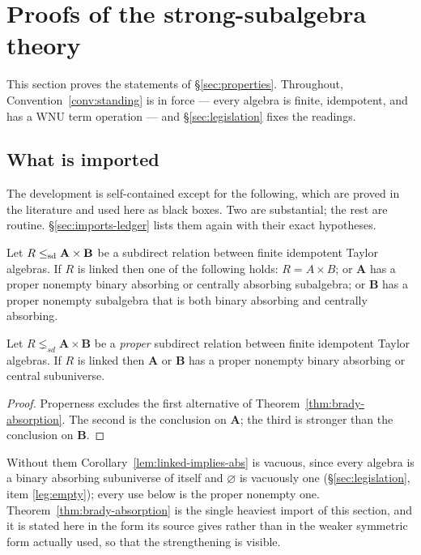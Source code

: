 \section{Proofs of the strong-subalgebra theory}\label{sec:strongproofs}

This section proves the statements of \S\ref{sec:properties}. Throughout,
Convention~\ref{conv:standing} is in force --- every algebra is finite,
idempotent, and has a WNU term operation --- and \S\ref{sec:legislation} fixes
the readings.

\subsection{What is imported}\label{sec:imports}

The development is self-contained except for the following, which are proved in
the literature and used here as black boxes. Two are substantial; the rest are
routine. \S\ref{sec:imports-ledger} lists them again with their exact
hypotheses.

\begin{longtheorem}\label{thm:brady-absorption}
Let $R\le_{\mathrm{sd}}\mathbf A\times\mathbf B$ be a subdirect relation between finite
idempotent Taylor algebras. If $R$ is linked then one of the following holds:
$R=A\times B$; or $\mathbf A$ has a proper nonempty binary absorbing or
centrally absorbing subalgebra; or $\mathbf B$ has a proper nonempty subalgebra
that is both binary absorbing and centrally absorbing.
\end{longtheorem}

\begin{corollary}
\label{lem:linked-implies-abs}
Let $R\lneq_{sd}\mathbf A\times\mathbf B$ be a \emph{proper} subdirect
relation between finite idempotent Taylor algebras. If $R$ is linked then
$\mathbf A$ or $\mathbf B$ has a proper nonempty binary absorbing or central
subuniverse.
\end{corollary}

\begin{proof}
Properness excludes the first alternative of
Theorem~\ref{thm:brady-absorption}. The second is the conclusion on
$\mathbf A$; the third is stronger than the conclusion on $\mathbf B$.
\end{proof}

\begin{hazard}
\label{haz:linked-abs-proper}
Without them Corollary~\ref{lem:linked-implies-abs} is vacuous, since every
algebra is a binary absorbing subuniverse of itself and $\varnothing$ is
vacuously one (\S\ref{sec:legislation}, item \ref{leg:empty}); every use below
is the proper nonempty one. Theorem~\ref{thm:brady-absorption} is the single
heaviest import of this section, and it is stated here in the form its source
gives rather than in the weaker symmetric form actually used, so that the
strengthening is visible.
\end{hazard}

